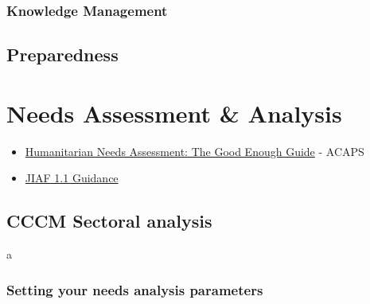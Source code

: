 \documentclass[
  a4paper,
  onecolumn,
  oneside]{book}
\providecommand{\tightlist}{%
  \setlength{\itemsep}{0pt}\setlength{\parskip}{0pt}}\usepackage{longtable,booktabs,array}
\begin{document}
\hypertarget{knowledge-management}{%
\subsection{Knowledge Management}\label{knowledge-management}}

\hypertarget{preparedness}{%
\section{Preparedness}\label{preparedness}}

\hypertarget{needs-assessment-analysis}{%
\chapter{Needs Assessment \& Analysis}\label{needs-assessment-analysis}}

\begin{tcolorbox}[enhanced jigsaw, left=2mm, rightrule=.15mm, arc=.35mm, coltitle=black, opacityback=0, colframe=quarto-callout-tip-color-frame, breakable, toprule=.15mm, titlerule=0mm, leftrule=.75mm, opacitybacktitle=0.6, title=\textcolor{quarto-callout-tip-color}{\faLightbulb}\hspace{0.5em}{Recommended reading}, bottomtitle=1mm, toptitle=1mm, bottomrule=.15mm, colbacktitle=quarto-callout-tip-color!10!white, colback=white]

\begin{itemize}
\tightlist
\item
  \href{files/humanitarian_needs_assessment-the_good_enough_guide_2014.pdf}{Humanitarian
  Needs Assessment: The Good Enough Guide} - ACAPS
\item
  \href{files/4.\%20HPC_2023-JIAF_Guide\%201.1.pdf}{JIAF 1.1 Guidance}
\end{itemize}

\end{tcolorbox}

\hypertarget{cccm-sectoral-analysis}{%
\section{CCCM Sectoral analysis}\label{cccm-sectoral-analysis}}

a

\hypertarget{setting-your-needs-analysis-parameters}{%
\subsection{Setting your needs analysis
parameters}\label{setting-your-needs-analysis-parameters}}
\end{document}
